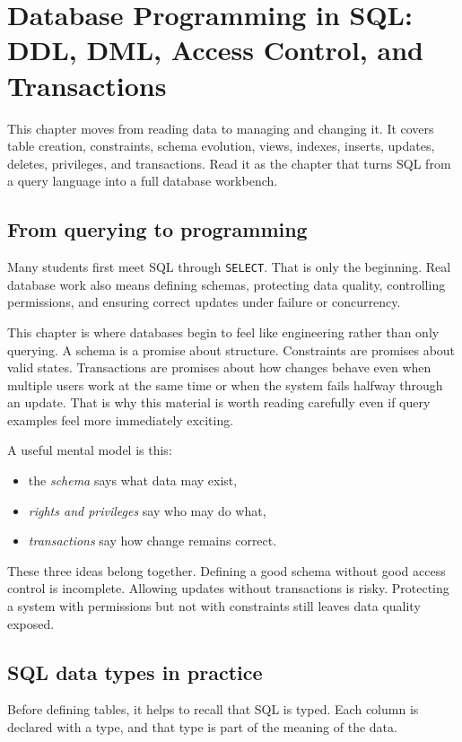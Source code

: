 \documentclass[11pt,a4paper,openany]{book}
\begin{document}
\chapter[Database Programming in SQL]{Database Programming in SQL: DDL, DML, Access Control, and Transactions}
\label{ch:sqlprog}
\begin{guidancebox}
This chapter moves from reading data to managing and changing it. It covers table creation, constraints, schema evolution, views, indexes, inserts, updates, deletes, privileges, and transactions. Read it as the chapter that turns SQL from a query language into a full database workbench.
\end{guidancebox}

\section{From querying to programming}
Many students first meet SQL through \texttt{SELECT}. That is only the beginning. Real database work also means defining schemas, protecting data quality, controlling permissions, and ensuring correct updates under failure or concurrency.

This chapter is where databases begin to feel like engineering rather than only querying. A schema is a promise about structure. Constraints are promises about valid states. Transactions are promises about how changes behave even when multiple users work at the same time or when the system fails halfway through an update. That is why this material is worth reading carefully even if query examples feel more immediately exciting.

A useful mental model is this:
\begin{itemize}
\item the \emph{schema} says what data may exist,
\item \emph{rights and privileges} say who may do what,
\item \emph{transactions} say how change remains correct.
\end{itemize}

These three ideas belong together. Defining a good schema without good access control is incomplete. Allowing updates without transactions is risky. Protecting a system with permissions but not with constraints still leaves data quality exposed.

\section{SQL data types in practice}
Before defining tables, it helps to recall that SQL is typed. Each column is declared with a type, and that type is part of the meaning of the data.
\end{document}
